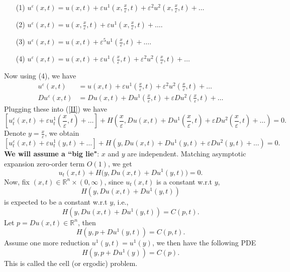 \documentclass[12pt, oneside]{amsart}  	%
\begin{document}
\begin{itemize}
\item[(1)] $u^\varepsilon(x,t) = u(x,t)+\varepsilon u^1\left(x,\frac{x}{\varepsilon},t\right) + \varepsilon^2 u^2\left(x,\frac{x}{\varepsilon},t\right) + \ldots$ \vspace*{0.5cm}
\item[(2)] $u^\varepsilon(x,t) = u\left(x,\frac{x}{\varepsilon},t\right) + \varepsilon u^1\left(x,\frac{x}{\varepsilon},t\right) + \ldots$.
\vspace*{0.5cm}
\item[(3)] $u^\varepsilon(x,t) = u\left(x,t\right) + \varepsilon^5 u^1\left(\frac{x}{\varepsilon},t\right) + \ldots$.
\vspace*{0.5cm}
\item[(4)] $u^\varepsilon(x,t) = u(x,t)+\varepsilon u^1\left(\frac{x}{\varepsilon},t\right) + \varepsilon^2 u^2\left(\frac{x}{\varepsilon},t\right) + \ldots$
\end{itemize}
Now using (4), we have
\begin{align*}
u^\varepsilon(x,t) &= u(x,t)+\varepsilon u^1\left(\frac{x}{\varepsilon},t\right) + \varepsilon^2 u^2\left(\frac{x}{\varepsilon},t\right) + \ldots \\
Du^\varepsilon(x,t) &= Du(x,t)+Du^1\left(\frac{x}{\varepsilon},t\right) + \varepsilon Du^2\left(\frac{x}{\varepsilon},t\right) + \ldots
\end{align*}
Plugging these into (\ref{II}) we have
\begin{equation*}
\left[u_t^\varepsilon(x,t) + \varepsilon u^1_t\left(\frac{x}{\varepsilon},t\right) + \ldots \right] + H\left( \frac{x}{\varepsilon}, Du(x,t)+Du^1\left(\frac{x}{\varepsilon},t\right) + \varepsilon Du^2\left(\frac{x}{\varepsilon},t\right) + \ldots\right)=0.
\end{equation*}
Denote $y = \frac{x}{\varepsilon}$, we obtain
\begin{equation*}
\left[u_t^\varepsilon(x,t) + \varepsilon u^1_t\left(y,t\right) + \ldots \right] + H\left( y, Du(x,t)+Du^1\left(y,t\right) + \varepsilon Du^2\left(y,t\right) + \ldots\right)=0.
\end{equation*}
{ \textbf{We will assume a ``big lie"}:} $x$ and $y$ are independent. Matching asymptotic expansion zero-order term $O(1)$, we get
\begin{equation*}
u_t(x,t) + H\Big(y,Du(x,t) + Du^1(y,t)\Big) = 0.
\end{equation*}
Now, fix $(x,t)\in \mathbb{R}^n\times(0,\infty)$, since $u_t(x,t)$ is a constant w.r.t $y$,
$$H(y,Du(x,t) + Du^1(y,t))$$
is expected to be a constant w.r.t $y$, i.e.,
\begin{equation*}
H(y,Du(x,t)+ Du^1(y,t)) = C(p,t).
\end{equation*}
Let $p= Du(x,t) \in \mathbb{R}^n$, then
\begin{equation*}
H(y,p+Du^1(y,t)) = C(p,t).
\end{equation*}
Assume one more reduction $u^1(y,t) = u^1(y)$, we then have the following PDE
\begin{equation*}
H(y, p+Du^1(y)) = C(p).
\end{equation*}
This is called the cell (or ergodic) problem.
\end{document}
